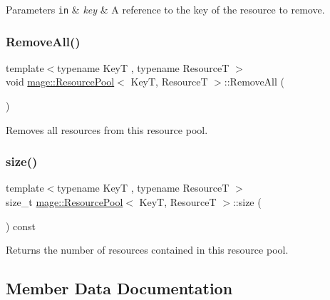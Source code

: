 \begin{DoxyParams}[1]{Parameters}
\mbox{\tt in}  & {\em key} & A reference to the key of the resource to remove. \\
\hline
\end{DoxyParams}
\mbox{\label{classmage_1_1_resource_pool_ab524641cccb1edbf761b94779b5ca5bc}} 
\subsubsection{\texorpdfstring{Remove\+All()}{RemoveAll()}}
{\footnotesize\ttfamily template$<$typename KeyT , typename ResourceT $>$ \\
void \mbox{\hyperlink{classmage_1_1_resource_pool}{mage\+::\+Resource\+Pool}}$<$ KeyT, ResourceT $>$\+::Remove\+All (\begin{DoxyParamCaption}{ }\end{DoxyParamCaption})\hspace{0.3cm}{\ttfamily [noexcept]}}

Removes all resources from this resource pool. \mbox{\label{classmage_1_1_resource_pool_ab032684a1ed5a782a61f663e269a994a}} 
\subsubsection{\texorpdfstring{size()}{size()}}
{\footnotesize\ttfamily template$<$typename KeyT , typename ResourceT $>$ \\
size\+\_\+t \mbox{\hyperlink{classmage_1_1_resource_pool}{mage\+::\+Resource\+Pool}}$<$ KeyT, ResourceT $>$\+::size (\begin{DoxyParamCaption}{ }\end{DoxyParamCaption}) const\hspace{0.3cm}{\ttfamily [noexcept]}}

Returns the number of resources contained in this resource pool. 

\subsection{Member Data Documentation}
\mbox{\label{classmage_1_1_resource_pool_a3d6d7b0e2e9c3271f8ae3b7c2fa704ba}} 
